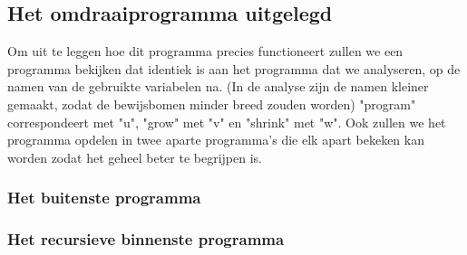 \subsection{Het omdraaiprogramma uitgelegd}
\label{sec:uitleg programma}

Om uit te leggen hoe dit programma precies functioneert zullen we een programma bekijken dat identiek is aan het programma dat we analyseren, op de namen van de gebruikte variabelen na. (In de analyse zijn de namen kleiner gemaakt, zodat de bewijsbomen minder breed zouden worden)
"program" correspondeert met "u",
"grow" met "v" en 
"shrink" met "w".
Ook zullen we het programma opdelen in twee aparte programma's die elk apart bekeken kan worden zodat het geheel beter te begrijpen is.
\medskip

\subsubsection{Het buitenste programma}


\subsubsection{Het recursieve binnenste programma}


